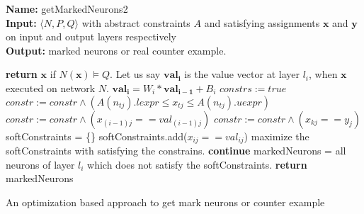 \begin{algorithm}[t]
  \textbf{Name: } getMarkedNeurons2 \\
  \textbf{Input: } $\langle N,P,Q \rangle$ with abstract constraints $A$ and satisfying assignments $\boldsymbol{x}$ and $\boldsymbol{y}$ on input and output layers respectively\\
  \textbf{Output: } marked neurons or real counter example. 
  \begin{algorithmic}[1]
    \State \textbf{return} $\boldsymbol{x}$ if $N(\boldsymbol{x}) \models Q$. 
    \State Let us say $\boldsymbol{val_{i}}$ is the value vector at layer $l_i$, when $\boldsymbol{x}$ executed on network $N$. 
     
        \State $\boldsymbol{val_i} = W_i * \boldsymbol{val_{i-1}} + B_i$ 
      \Else {}
        \State $constrs := true$
            \State $constr := constr \land (A(n_{tj}).lexpr \leq x_{tj}\leq A(n_{tj}).uexpr)$
          \EndFor
        \EndFor
          \State $constr := constr \land (x_{(i-1)j} == val_{(i-1)j})$
        \EndFor
          \State $constr := constr \land (x_{kj} == y_{j})$
        \EndFor
        softConstraints = \{\}
          \State softConstraints.add($x_{ij} == val_{ij}$)
        \EndFor
        \State maximize the softConstraints with satisfying the constrains. 
          \State \textbf{continue}
        \Else
          \State markedNeurons = all neurons of layer $l_i$ which does not satisfy the softConstraints. 
          \State \textbf{return} markedNeurons
        \EndIf 
      \EndIf
    \EndFor
  \end{algorithmic}
  \caption{An optimization based approach to get mark neurons or counter example}
  \label{algo:refine2}
\end{algorithm}







